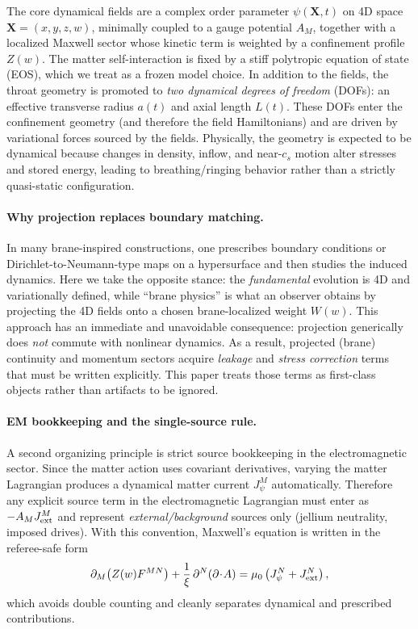 \documentclass[11pt]{article}
\begin{document}
The core dynamical fields are a complex order parameter $\psi(\mathbf{X},t)$ on 4D space $\mathbf{X}=(x,y,z,w)$, minimally coupled to a gauge potential $A_M$, together with a localized Maxwell sector whose kinetic term is weighted by a confinement profile $Z(w)$. The matter self-interaction is fixed by a stiff polytropic equation of state (EOS), which we treat as a frozen model choice. In addition to the fields, the throat geometry is promoted to \emph{two dynamical degrees of freedom} (DOFs): an effective transverse radius $a(t)$ and axial length $L(t)$. These DOFs enter the confinement geometry (and therefore the field Hamiltonians) and are driven by variational forces sourced by the fields. Physically, the geometry is expected to be dynamical because changes in density, inflow, and near-$c_s$ motion alter stresses and stored energy, leading to breathing/ringing behavior rather than a strictly quasi-static configuration.

\paragraph{Why projection replaces boundary matching.}
In many brane-inspired constructions, one prescribes boundary conditions or Dirichlet-to-Neumann-type maps on a hypersurface and then studies the induced dynamics. Here we take the opposite stance: the \emph{fundamental} evolution is 4D and variationally defined, while ``brane physics'' is what an observer obtains by projecting the 4D fields onto a chosen brane-localized weight $W(w)$. This approach has an immediate and unavoidable consequence: projection generically does \emph{not} commute with nonlinear dynamics. As a result, projected (brane) continuity and momentum sectors acquire \emph{leakage} and \emph{stress correction} terms that must be written explicitly. This paper treats those terms as first-class objects rather than artifacts to be ignored.

\paragraph{EM bookkeeping and the single-source rule.}
A second organizing principle is strict source bookkeeping in the electromagnetic sector. Since the matter action uses covariant derivatives, varying the matter Lagrangian produces a dynamical matter current $J_\psi^M$ automatically. Therefore any explicit source term in the electromagnetic Lagrangian must enter as $-A_M J_{\rm ext}^M$ and represent \emph{external/background} sources only (jellium neutrality, imposed drives). With this convention, Maxwell's equation is written in the referee-safe form
\begin{equation}
\partial_M\!\left(Z(w)F^{MN}\right)+\frac{1}{\xi}\,\partial^N(\partial\!\cdot\!A)
=\mu_0\left(J_\psi^N+J_{\rm ext}^N\right),
\end{equation}
which avoids double counting and cleanly separates dynamical and prescribed contributions.
\end{document}

